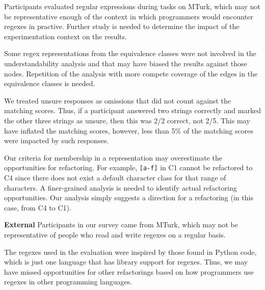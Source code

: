 Participants evaluated regular expressions during tasks on MTurk, which may not be representative enough of the context in which programmers would encounter regexes in practive. Further study is needed to determine the impact of the experimentation context on the results.

Some regex representations from the equivalence classes were not involved in the understandability analysis and that may have biased the results against those nodes. Repetition of the analysis with more compete coverage of the edges in the equivalence classes is needed.

We treated unsure responses as omissions that  did not count  against the matching scores. Thus, if a participant answered two strings correctly and marked the other three strings as unsure, then this was 2/2 correct, not 2/5. This may have inflated the matching scores, however, less than 5\% of the matching scores were impacted by such responses.

Our criteria for membership in a representation may overestimate the opportunities for refactoring. For example, \verb![a-f]! in C1 cannot be refactored to C4 since there does not exist a default character class for that range of characters. A finer-grained analysis is needed to identify actual refactoring opportunities. Our analysis simply suggests a direction for a refactoring (in this case, from C4 to C1). 

%

\textbf{External}
Participants in our survey came from MTurk, which may not be representative of people who read and write regexes on a regular basis.

The regexes  used in the evaluation were inspired by those found in Python code, which is just one language that has library support for regexes. Thus, we may have missed opportunities for other refactorings based on how programmers use regexes in other programming languages.

